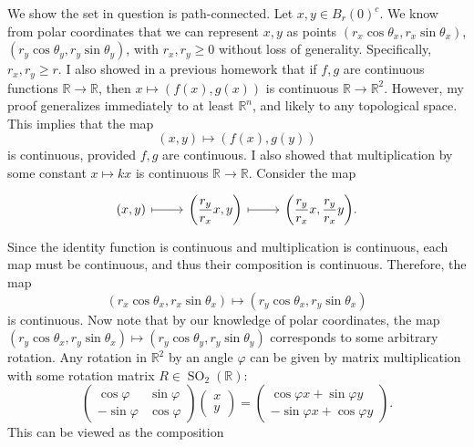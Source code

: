 \documentclass[11pt, letterpaper]{article}
\begin{document}
We show the set in question is path-connected. Let $x,y\in B_r(0)^{c} $. We know from polar coordinates that we can represent $x,y$ as points $(r_x \cos \theta_x ,r_x \sin \theta_x )$, $(r_y \cos \theta_y ,r_y \sin \theta _y)$, with $r_x,r_y \geq 0$ without loss of generality. Specifically, $r_x,r_y \geq r$. I also showed in a previous homework that if $f,g$ are continuous functions $\mathbb{R} \to \mathbb{R} $, then $x\mapsto (f(x),g(x))$ is continuous $\mathbb{R} \to \mathbb{R} ^2$. However, my proof generalizes immediately to at least $\mathbb{R} ^n$, and likely to any topological space. This implies that the map
\[
	(x,y)\mapsto (f(x),g(y))
\]
is continuous, provided $f,g$ are continuous. I also showed that multiplication by some constant $x\mapsto kx$ is continuous $\mathbb{R} \to \mathbb{R} $. Consider the map
\[\begin{tikzcd}[row sep = 2.5em, column sep = 2.5em]
	(x,y)\ar[r, mapsto]&\displaystyle{\left( \frac{r_y}{r_x} x,y \right) }\ar[r, mapsto]&\displaystyle{\left( \frac{r_y}{r_x}  x ,\frac{r_y}{r_x} y \right) }.
\end{tikzcd}\]
Since the identity function is continuous and multiplication is continuous, each map must be continuous, and thus their composition is continuous. Therefore, the map
\[
	(r_x \cos \theta_x ,r_x \sin \theta_x )\mapsto (r_y \cos \theta _x,r_y \sin \theta _x)
\]
is continuous. Now note that by our knowledge of polar coordinates, the map $(r_y \cos \theta _x,r_y \sin \theta _x)\mapsto (r_y \cos \theta _y, r_y \sin \theta _y)$ corresponds to some arbitrary rotation. Any rotation in $\mathbb{R} ^2$ by an angle $\varphi $ can be given by matrix multiplication with some rotation matrix $R\in \operatorname{SO}_2(\mathbb{R} )$:
\[
	\begin{pmatrix}
	\cos \varphi  & \sin \varphi  \\
	-\sin \varphi  & \cos \varphi 
	\end{pmatrix}\begin{pmatrix}
	x \\
	y
	\end{pmatrix}=\begin{pmatrix}
	\cos \varphi x+\sin \varphi y \\
	-\sin \varphi x+\cos \varphi y
	\end{pmatrix}
.\]
This can be viewed as the composition
\end{document}
